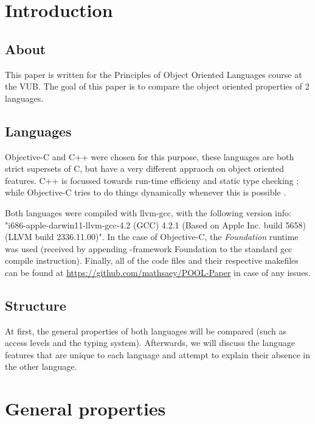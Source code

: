 \documentclass[12pt, a4paper, twocolumn]{article}
\begin{document}
\setlength{\parindent}{0pt}
\setlength{\parskip}{1ex}


\tableofcontents
\newpage

\section{Introduction}
\subsection{About}
This paper is written for the Principles of Object Oriented Languages course at the VUB. The goal of this paper is to compare the object oriented properties of 2 languages. 

\subsection{Languages}
Objective-C and C++ were chosen for this purpose, these languages are both strict supersets of C, but have a very different appraoch on object oriented features. C++ is focussed towards run-time efficieny and static type checking \cite{CPdesc}; while Objective-C tries to do things dynamically whenever this is possible \cite{OCRPG}.

Both languages were compiled with llvm-gcc, with the following version info: "i686-apple-darwin11-llvm-gcc-4.2 (GCC) 4.2.1 (Based on Apple Inc. build 5658) (LLVM build 2336.11.00)". In the case of Objective-C, the \textit{Foundation} runtime was used (received by appending -framework Foundation to the standard gcc compile instruction). Finally, all of the code files and their respective makefiles can be found at \url{https://github.com/mathsaey/POOL-Paper} in case of any issues.

\subsection{Structure}
At first, the general properties of both languages will be compared (such as access levels and the typing system). Afterwards, we will discuss the language features that are unique to each language and attempt to explain their absence in the other language.

\section{General properties}
\label{sec:general}
\end{document}
